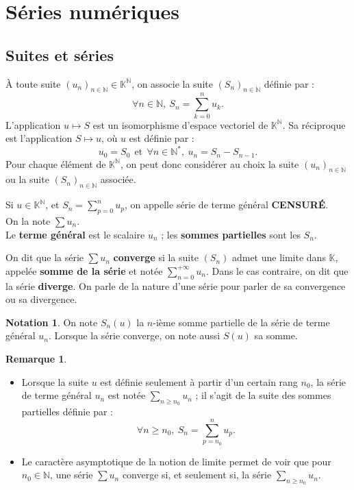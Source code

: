 \documentclass[french]{article}
\newcommand{\N}{\mathbb{N}}
\newcommand{\K}{\mathbb{K}}
\newcommand{\st}{^*}
\theoremstyle{plain}
\theoremstyle{definition}
\newtheorem*{rmq}{Remarque}
\newtheorem*{notation}{Notation}
\theoremstyle{remark}
\begin{document}
\section{Séries numériques}

\subsection{Suites et séries}

À toute suite $(u_n)_{n\in\N}\in\K^\N$, on associe la suite $(S_n)_{n\in\N}$ définie par : $$\forall n\in\N,\ S_n=\sum_{k=0}^{n}u_k.$$ L'application $u\mapsto S$ est un isomorphisme d'espace vectoriel de $\K^\N$. Sa réciproque est l'application $S\mapsto u$, où $u$ est définie par : $$u_0=S_0\ \ \text{et}\ \ \forall n\in\N\st,\  u_n=S_n-S_{n-1}.$$ Pour chaque élément de $\K^\N$, on peut donc considérer au choix la suite $(u_n)_{n\in\N}$ ou la suite $(S_n)_{n\in\N}$ associée.

\begin{dfn}
	Si $u\in\K^\N$, et $S_n=\displaystyle\sum_{p=0}^{n}u_p$, on appelle série de terme général \textbf{CENSUR\'E}. \\
	On la note $\displaystyle\sum u_n$. \\
	Le \textbf{terme général} est le scalaire $u_n$ ; les \textbf{sommes partielles} sont les $S_n$.
\end{dfn}

\begin{dfn}
	On dit que la série $\displaystyle\sum u_n$ \textbf{converge} si la suite $(S_n)$ admet une limite dans $\K$, appelée \textbf{somme de la série} et notée $\displaystyle\sum_{n=0}^{+\infty}u_n$. Dans le cas contraire, on dit que la série \textbf{diverge}. On parle de la nature d'une série pour parler de sa convergence ou sa divergence.
\end{dfn}

\begin{notation}
	On note $S_n(u)$ la $n$-ième somme partielle de la série de terme général $u_n$. Lorsque la série converge, on note aussi $S(u)$ sa somme.
\end{notation}

\begin{rmq}
	\begin{itemize}
		\item Lorsque la suite $u$ est définie seulement à partir d'un certain rang $n_0$, la série de terme général $u_n$ est notée $\displaystyle\sum_{n\geqslant n_0}u_n$ ; il s'agit de la suite des sommes partielles définie par : $$\forall n\geqslant n_0,\ S_n=\sum_{p=n_0}^{n}u_p.$$
		\item Le caractère asymptotique de la notion de limite permet de voir que pour $n_0\in\N$, une série $\displaystyle\sum u_n$ converge si, et seulement si, la série $\displaystyle\sum_{n\geqslant n_0}u_n$.
	\end{itemize}
\end{rmq}
\end{document}
